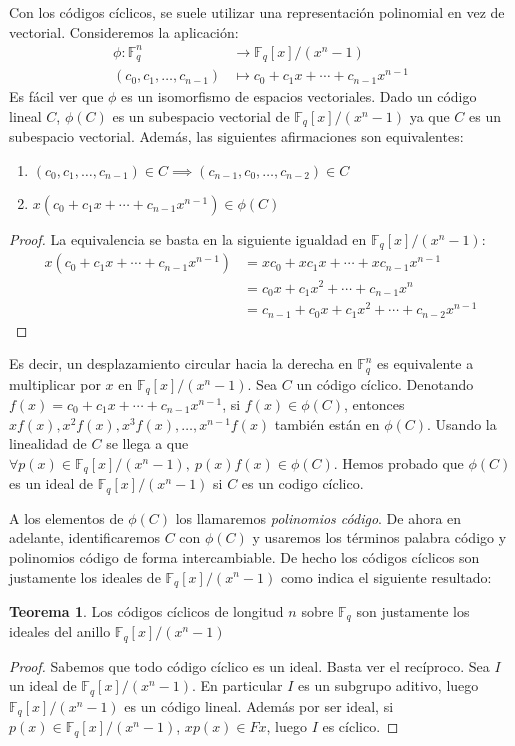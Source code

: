 \documentclass[a4paper,11pt]{article}
\numberwithin{equation}{section}
\theoremstyle{definition} %
\newtheorem{teorema}{Teorema}[section]
\newcommand{\Fq}{\mathbb{F}_q}
\newcommand{\Fqn}{\mathbb{F}_q^n}
\newcommand{\Fx}{\Fq[x]/(x^n - 1)}
\begin{document}
    Con los códigos cíclicos, se suele utilizar una representación polinomial en vez de vectorial. Consideremos la aplicación:
    \begin{align*}
        \phi: \Fqn &\to \Fx \\
        (c_0, c_1, \dots, c_{n-1}) & \mapsto c_0 + c_1 x + \cdots + c_{n-1} x^{n-1}
    \end{align*}
    Es fácil ver que $\phi$ es un isomorfismo de espacios vectoriales. Dado un código lineal $C$, $\phi(C)$ es un subespacio vectorial de $\Fx$ ya que $C$ es un subespacio vectorial. Además, las siguientes afirmaciones son equivalentes:
    \begin{enumerate}
        \item $(c_0, c_1, \dots, c_{n-1}) \in C \implies (c_{n-1}, c_0, \ldots, c_{n-2}) \in C$
        \item $x (c_0 + c_1 x + \cdots + c_{n-1} x^{n-1}) \in \phi(C)$
    \end{enumerate}
    \begin{proof}
        La equivalencia se basta en la siguiente igualdad en $\Fx$:
        \begin{align*}
            x (c_0 + c_1 x + \cdots + c_{n-1} x^{n-1}) &=
                x c_0 + x c_1 x + \cdots + x c_{n-1} x^{n-1} \\
                &= c_0 x + c_1 x^2  + \cdots + c_{n-1} x^{n} \\
                &= c_{n-1} + c_0 x + c_1 x^2 + \cdots + c_{n-2} x^{n-1}
        \end{align*}
    \end{proof}
    Es decir, un desplazamiento circular hacia la derecha en $\Fqn$ es equivalente a multiplicar por $x$ en $\Fx$. Sea $C$ un código cíclico. Denotando $f(x) = c_0 + c_1 x + \cdots + c_{n-1} x^{n-1}$, si $f(x) \in \phi(C)$, entonces $x f(x), x^2 f(x), x^3 f(x), \dots, x^{n-1} f(x)$ también están en $\phi(C)$. Usando la linealidad de $C$ se llega a que $\forall p(x) \in \Fx,\ p(x) f(x) \in \phi(C)$. Hemos probado que $\phi(C)$ es un ideal de $\Fx$ si $C$ es un codigo cíclico.

    A los elementos de $\phi(C)$ los llamaremos \emph{polinomios código}. De ahora en adelante, identificaremos $C$ con $\phi(C)$ y usaremos los términos palabra código y polinomios código de forma intercambiable. De hecho los códigos cíclicos son justamente los ideales de $\Fx$ como indica el siguiente resultado:

    \begin{teorema}
        Los códigos cíclicos de longitud $n$ sobre $\Fq$ son justamente los ideales del anillo $\Fx$
    \end{teorema}
    \begin{proof}
        Sabemos que todo código cíclico es un ideal. Basta ver el recíproco. Sea $I$ un ideal de $\Fx$. En particular $I$ es un subgrupo aditivo, luego $\Fx$ es un código lineal. Además por ser ideal, si $p(x) \in \Fx$, $x p(x) \in Fx$, luego $I$ es cíclico.
    \end{proof}
\end{document}

